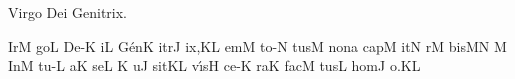 
\beginhymn Virgo Dei Genitrix.

\gregorianFclef
{}
\Internote
\nosolesmescustos
\initiumgregorianum
{}%
\sgn {}Ir\punctum M\egn
\sgn go{}\punctum L\egn
\spatium
\sgn D{e}-\punctum K\egn
\sgn {}i{}\punctum L\egn
\spatium
\sgn G{\'e}n\punctum K\egn
\sgn {}i{tr}\punctum J\egn
\sgn {}i{x,}\punctum K\augmentum L\egn
\spatium
\divisiominima
\spatium
{}em\punctum M\egn
\spatium
\sgn t{o}-\punctum N\egn
\sgn tus\punctum M\egn
\spatium
\sgn non\punctum a\egn
\spatium
\sgn c{a}p\punctum M\egn
\sgn {}it\punctum N\egn
\spatium
{}r\punctum M\egn
\sgn bis\punctum M\augmentum N\egn
\spatium
\custos M
\lineaproxima
\sgn {}In\punctum M\egn
\spatium
\sgn t{u}-\punctum L\egn
\sgn {}a{}\punctum K\egn
\spatium
\sgn se{}\punctum L\egn
\spatium
\sgn {}{ }{}\punctumcavum K\egn
\spatium
{}u\punctum J\egn
\sgn sit\punctum K\augmentum L\egn
\spatium
\divisiominima
\spatium
\sgn v{\'\i}s\punctum H\egn
\sgn ce-\punctum K\egn
\sgn ra{}\punctum K\egn
\spatium
\sgn f{a}c\punctum M\egn
\sgn tus\punctum L\egn
\spatium
\sgn h{o}m\punctum J\egn
\sgn {}o.\punctum K\augmentum L\egn
\spatium
\Finisgregoriana

\bigskip

\beginlyrics

